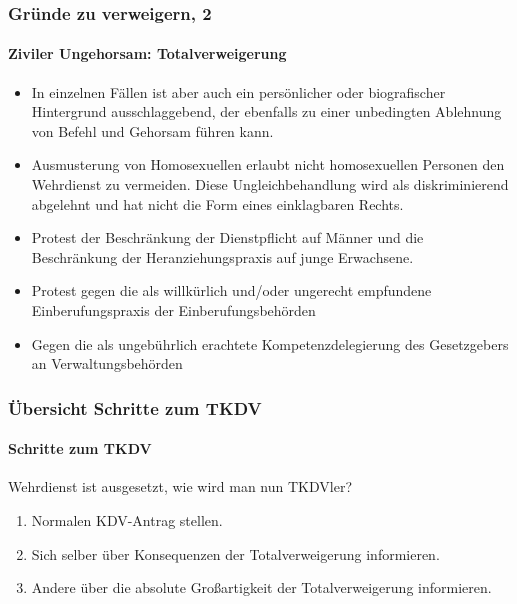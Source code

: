\documentclass{beamer}
\begin{document}
	\begin{frame}
		\frametitle{Gründe zu verweigern, 2}
		\framesubtitle{Ziviler Ungehorsam: Totalverweigerung}
		\begin{itemize}
			\item In einzelnen Fällen ist aber auch ein persönlicher oder biografischer Hintergrund ausschlaggebend, der ebenfalls zu einer unbedingten Ablehnung von Befehl und Gehorsam führen kann.
			\item Ausmusterung von Homosexuellen erlaubt nicht homosexuellen Personen den Wehrdienst zu vermeiden. Diese Ungleichbehandlung wird als diskriminierend abgelehnt und hat nicht die Form eines einklagbaren Rechts.
			\item Protest der Beschränkung der Dienstpflicht auf Männer und die Beschränkung der Heranziehungspraxis auf junge Erwachsene.
			\item Protest gegen die als willkürlich und/oder ungerecht empfundene Einberufungspraxis der Einberufungsbehörden
			\item Gegen die als ungebührlich erachtete Kompetenzdelegierung des Gesetzgebers an Verwaltungsbehörden
		\end{itemize}
	\end{frame}
	  	
	
	\begin{frame}
		\frametitle{Übersicht Schritte zum TKDV}
	  	\framesubtitle{Schritte zum TKDV}
	  	Wehrdienst ist ausgesetzt, wie wird man nun TKDVler? 
	  	\begin{enumerate}
	  		\item Normalen KDV-Antrag stellen.
	  		\item Sich selber über Konsequenzen der Totalverweigerung informieren.
	  		\item Andere über die absolute Großartigkeit der Totalverweigerung informieren.
	  	\end{enumerate}  			
	\end{frame}
	
\end{document}

